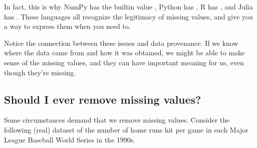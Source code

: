 \documentclass[letterpaper,10pt,english]{jupyterBook}
\begin{document}
\sphinxAtStartPar
In fact, this is why NumPy has the built\sphinxhyphen{}in value , Python has , R has , and Julia has .  These languages all recognize the legitimacy of missing values, and give you a way to express them when you need to.

\sphinxAtStartPar
Notice the connection between these issues and data provenance.  If we know where the data came from and how it was obtained, we might be able to make sense of the missing values, and they can have important meaning for us, even though they’re missing.


\subsection{Should I ever remove missing values?}
\label{\detokenize{chapter-13-etl:should-i-ever-remove-missing-values}}
\sphinxAtStartPar
{}

\sphinxAtStartPar
Some circumstances demand that we remove missing values.  Consider the following (real) dataset of the number of home runs hit per game in each Major League Baseball World Series in the 1990s.
\end{document}
